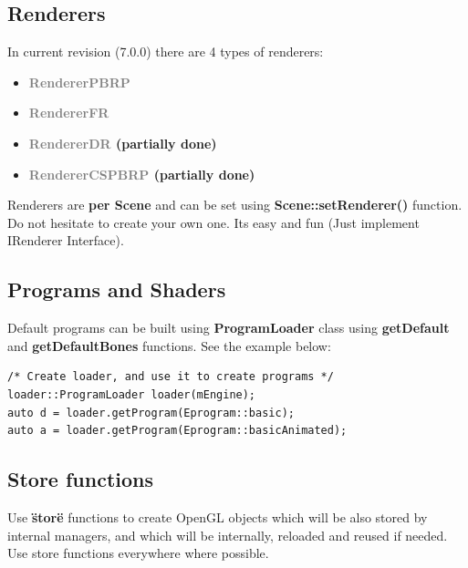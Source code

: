 \documentclass{article}
\begin{document}
\subsection{Renderers}\label{sec:Renderers}

\indent \indent In current revision (7.0.0) there are 4 types of renderers:

\begin{itemize}
\item \textbf{\textcolor{gray}{RendererPBRP}}
\item \textbf{\textcolor{gray}{RendererFR}}
\item \textbf{\textcolor{gray}{RendererDR} (partially done)}
\item \textbf{\textcolor{gray}{RendererCSPBRP} (partially done)}
\end{itemize}

\indent \indent Renderers are \textbf{per Scene} and can be set using \textbf{Scene::setRenderer()} function. Do not hesitate to create your own one. Its easy and fun (Just implement IRenderer Interface).

\subsection{Programs and Shaders}\label{sec:Programs and Shaders}
\indent \indent Default programs can be built using \textbf{ProgramLoader} class using \textbf{getDefault} and \textbf{getDefaultBones} functions. See the example below:

\begin{lstlisting}
/* Create loader, and use it to create programs */
loader::ProgramLoader loader(mEngine);
auto d = loader.getProgram(Eprogram::basic);
auto a = loader.getProgram(Eprogram::basicAnimated);
\end{lstlisting}

\subsection{Store functions}\label{sec:store functions}
\indent \indent Use \textbf{\"store\"} functions to create OpenGL objects which will be also stored by internal managers, and which will be internally, reloaded and reused if needed. Use store functions everywhere where possible.
\end{document}
